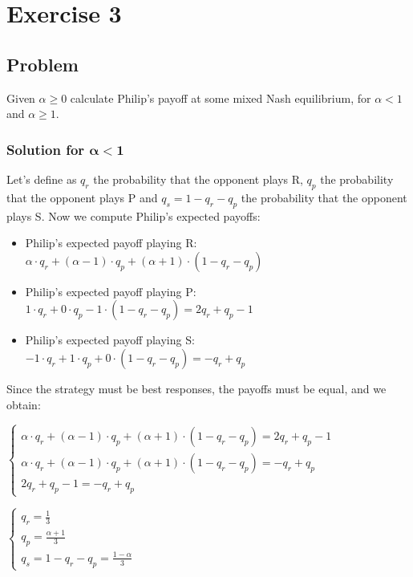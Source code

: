 \documentclass[11pt]{article}
\begin{document}
\newpage

\section*{Exercise 3}
\subsection*{Problem}
Given $\alpha \ge 0$ calculate Philip’s payoff at some mixed Nash equilibrium, for $\alpha < 1$ and $\alpha \ge 1$.
\subsubsection*{Solution for $\mathbf{\alpha < 1}$}
Let's define as $q_r$ the probability that the opponent plays R, $q_p$ the probability that the opponent plays P and $q_s = 1 - q_r - q_p$ the probability that the opponent plays S. Now we compute Philip's expected payoffs:
\begin{itemize}
	\item Philip's expected payoff playing R: $\alpha \cdot q_r + (\alpha - 1) \cdot q_p + (\alpha + 1) \cdot (1 - q_r - q_p)$
	\item Philip's expected payoff playing P: $1 \cdot q_r + 0 \cdot q_p -1 \cdot (1 - q_r - q_p) = 2q_r + q_p - 1$
	\item Philip's expected payoff playing S: $-1 \cdot q_r + 1 \cdot q_p + 0 \cdot (1 - q_r - q_p) = -q_r + q_p$
\end{itemize}
Since the strategy must be best responses, the payoffs must be equal, and we obtain: \\
\begin{minipage}[t]{0.63\textwidth}
\(\left \{ \begin{array}{l}
\alpha \cdot q_r + (\alpha - 1) \cdot q_p + (\alpha + 1) \cdot (1 - q_r - q_p) = 2q_r + q_p - 1\\
\alpha \cdot q_r + (\alpha - 1) \cdot q_p + (\alpha + 1) \cdot (1 - q_r - q_p) = -q_r + q_p\\
2q_r + q_p - 1 = -q_r + q_p
\end{array}
\right. \)
\end{minipage}
\begin{minipage}[t]{0.07\textwidth}
	\raisebox{-.5\height}{\scalebox{2}{$\Rightarrow$}}
\end{minipage}
\begin{minipage}[t]{0.3\textwidth}
	\(\left \{ \begin{array}{l}
		q_r = \frac{1}{3} \\
		q_p = \frac{\alpha + 1}{3} \\
		q_s = 1 - q_r - q_p = \frac{1 - \alpha}{3}
	\end{array}
	\right. \)
\end{minipage} \\
\end{document}

